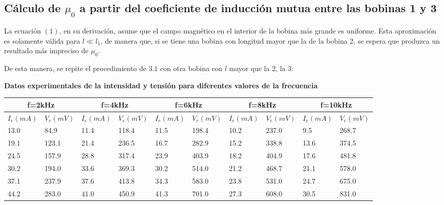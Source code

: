 \documentclass[a4paper,12pt]{article}
\begin{document}
\subsection{Cálculo de $\mu_0$ a partir del coeficiente de inducción mutua entre las bobinas 1 y 3}
La ecuación $(1)$, en su derivación, asume que el campo magnético en el interior de la bobina más grande es uniforme. Esta aproximación es solamente válida para $l \ll l_1$, de manera que, si se tiene una bobina con longitud mayor que la de la bobina 2, se espera que produzca un resultado más impreciso de $\mu_0$. 

De esta manera, se repite el procedimiento de $3.1$ con otra bobina con $l$ mayor que la 2, la 3:

\begin{center}
    \textbf{Datos experimentales de la intensidad y tensión para diferentes valores de la frecuencia}
\end{center}

\begin{table}[h!]
    \hskip-1.5cm
    \begin{tabular}{|l|l|l|l|l|l|l|l|l|l|}
        \hline
    \multicolumn{2}{|c|}{f=2kHz} &\multicolumn{2}{|c|}{f=4kHz} &\multicolumn{2}{|c|}{f=6kHz} &\multicolumn{2}{|c|}{f=8kHz} &\multicolumn{2}{|c|}{f=10kHz}  \\ \hline
        $I_{e}(mA)$ & $V_e(mV)$ & $I_{e}(mA)$ & $V_e(mV)$ &$I_{e}(mA)$ & $V_e(mV)$ &$I_{e}(mA)$ & $V_e(mV)$&$I_{e}(mA)$ & $V_e(mV)$ \\ \hline
        13.0 & 84.9 & 11.4 & 118.4 & 11.5 & 198.4 & 10.2 & 237.0 & 9.5 & 268.7 \\ \hline
        19.1 & 123.1 & 21.4 & 236.5 & 16.7 & 282.9 & 15.2 & 338.8 & 13.6 & 374.5 \\ \hline
        24.5 & 157.9 & 28.8 & 317.4 & 23.9 & 403.9 & 18.2 & 404.9 & 17.6 & 481.8 \\ \hline
        30.2 & 194.0 & 33.6 & 369.3 & 30.2 & 514.0 & 21.2 & 468.7 & 21.1 & 578.0 \\ \hline
        37.1 & 237.9 & 37.6 & 413.8 & 34.3 & 583.0 & 23.8 & 531.0 & 24.7 & 675.0 \\ \hline
        44.2 & 283.0 & 41.0 & 450.9 & 41.3 & 701.0 & 27.3 & 608.0 & 30.5 & 831.0 \\ \hline
    \end{tabular}
\end{table}
\end{document}
